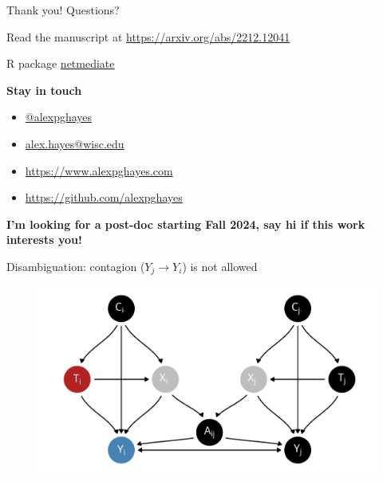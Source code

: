 \documentclass[aspectratio=169]{beamer}
\theoremstyle{remark}
\begin{document}
\begin{frame}{Thank you! Questions?}

    Read the manuscript at \url{https://arxiv.org/abs/2212.12041}

    R package \href{https://github.com/alexpghayes/netmediate}{netmediate}

    \textbf{Stay in touch}

    \begin{itemize}
        \item[]  \href{https://twitter.com/alexpghayes}{@alexpghayes}
        \item[]  \href{mailto:alex.hayes@wisc.edu}{alex.hayes@wisc.edu}
        \item[]  \url{https://www.alexpghayes.com} %
        \item[]  \url{https://github.com/alexpghayes}
    \end{itemize}

    \textbf{I'm looking for a post-doc starting Fall 2024, say hi if this work interests you!}
\end{frame}

\appendix

\begin{frame}{Disambiguation: contagion ($Y_j \to Y_i$) is not allowed}

    \centering

    \begin{figure}
        \includegraphics[scale=0.7]{figures/dags/homophily-mediating-contagion-peer.png}
        \label{fig:contagion}
    \end{figure}

\end{frame}
\end{document}

